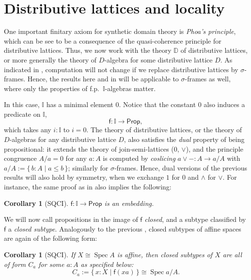 \documentclass[12pt]{amsart}
\newtheorem{corollary}[theorem]{Corollary}
\theoremstyle{definition}
\newcommand{\mbb}[1]{\mathbb{#1}}
\newcommand{\I}{\mbb I}
\newcommand{\ms}[1]{\mathsf{#1}}
\newcommand{\scomp}[2]{\{\,#1\mid#2\,\}}
\newcommand{\pp}{\ms{Prop}}
\newcommand{\spec}{\operatorname{Spec}}
\begin{document}
\section{Distributive lattices and locality}\label{sec:locality}

One important finitary axiom for synthetic domain theory is \emph{Phoa's principle}, which can be see to be a consequence of the quasi-coherence principle for distributive lattices.  Thus, we now work with the theory $\mbb D$ of distributive lattices, or more generally the theory of $D$-algebra for some distributive lattice $D$. As indicated in , computation  will not change if we replace distributive lattices by $\sigma$-frames. Hence, the results here and in  will be applicable to $\sigma$-frames as well, where only the properties of f.p.\ $\I$-algebras matter.

In this case, $\I$ has a minimal element $0$. Notice that the constant $0$ also induces a predicate on $\I$,
\[ \ms f : \I \to \pp, \]
which takes any $i : \I$ to $i = 0$. The theory of distributive lattices, or the theory of $D$-algebras for any distributive lattice $D$, also satisfies the \emph{dual} property of being propositional: it extends the theory of join-semi-lattices ($0$, $\vee$), and the principle congruence $A/a = 0$ for any $a:A$ is computed by \emph{coslicing} $a \vee - : A \to a/A$ with $a/A := \scomp{b:A}{a \le b}$; similarly for $\sigma$-frames.  Hence, dual versions of the previous results will also hold by symmetry, when we exchange $1$ for $0$ and $\wedge$ for $\vee$. For instance, the same proof as in  also implies the following:

\begin{corollary}[SQCI]
  $\ms f : \I \to \pp$ is an embedding.
\end{corollary}

We will now call propositions in the image of $\ms f$ \emph{closed}, and a subtype classified by $\ms f$ a \emph{closed subtype}. Analogously to the previous , closed subtypes of affine spaces are again of the following form:

\begin{corollary}[SQCI]\label{cor:closedaffinealgebra}
  If $X \cong \spec A$ is affine, then closed subtypes of $X$ are all of form $C_a$ for some $a:A$ as specified below:
  \[ C_a := \scomp{x : X}{\ms f(xa)} \cong \spec a/A. \]
\end{corollary}
\end{document}
